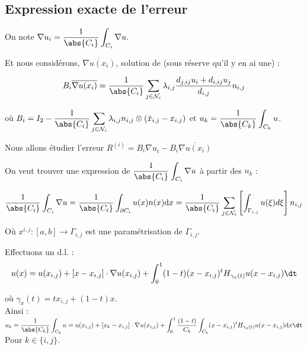 \documentclass[12pt,a4paper]{article}
\begin{document}
	\subsection{Expression exacte de l'erreur}
	
	On note $ {\nabla u}_i = \dfrac1{\abs{C_i}}\displaystyle\int_{C_i}  {\nabla u}$.
	
	Et nous considérons, $ {\overline{ {\nabla u}(x_i)}}$, solution de (sous réserve qu'il y en ai une) :
	
	\begin{equation}
		B_i {\overline{ {\nabla u}(x_i)}} = \dfrac1{\abs{C_i}}\sum_{j \in \mathcal N_i} \lambda_{i,j}\dfrac{d_{j,ij}u_i + d_{i,ij}u_j}{d_{i,j}} {n_{i,j}}
	\end{equation}
	
	où $B_i = I_2 - \dfrac1{\abs{C_i}}\displaystyle\sum_{j \in \mathcal N_i} \lambda_{i,j} {n_{i,j}}\otimes\left( {\bar x_{i,j}-x_{i,j}}\right)$ et $u_k = \dfrac1{\abs{C_k}}\displaystyle\int_{C_k} u$.
	
	\begin{tcolorbox}[title=\textbf{Objectif}]
		\begin{center}
			Nous allons étudier l'erreur $ {R^{(i)}} = B_i {\nabla u}_i - B_i {\overline{ {\nabla u}(x_i)}}$
		\end{center}
	\end{tcolorbox}	
	
	On veut trouver une expression de $\dfrac1{\abs{C_i}}\displaystyle\int_{C_i}  {\nabla u}$ à partir des $u_k$ :
	
	\begin{equation}\label{eq:objectif}
		\dfrac1{\abs{C_i}}\displaystyle\int_{C_i}  {\nabla u} = \dfrac1{\abs{C_i}}\int_{\partial C_i} u(  x) {n(x)} \mathrm d  x = \dfrac1{\abs{C_i}}\sum_{j \in \mathcal N_i} \left[\int_{\Gamma_{i,j}} u( \xi)d \xi\right]  {n_{i,j}}
	\end{equation}
	
	Où $ x^{i,j} : [a,b]  \to \Gamma_{i,j}$ est une paramétrisation de $\Gamma_{i,j}$.
	
	Effectuons un d.l. :
	\[
	u(  x) = u(  x_{i,j}) + \left[ {x-x_{i,j}}\right]\cdot {\nabla u}(x_{i,j}) + \displaystyle\int_0^1 (1-t)( {x-x_{i,j}})^tH_{\gamma_{x}(t)}u ( {x-x_{i,j}}) \dt
	\]
	
	où $\gamma_x(t) = tx_{i,j} + (1-t)x$.\\
	
	Ainsi : $u_k = \dfrac1{\abs{C_k}}\displaystyle\int_{C_k} u = u(  x_{i,j}) + \left[  x_k-  x_{i,j}\right]\cdot {\nabla u}(x_{i,j}) + \int_0^1 \dfrac{(1-t)}{C_k}\int_{C_k}( {x-x_{i,j}})^tH_{\gamma_{x}(t)}u ( {x-x_{i,j}})\mathrm d  x \dt$\\
	Pour $k \in \{i,j\}$.
	
\end{document}
